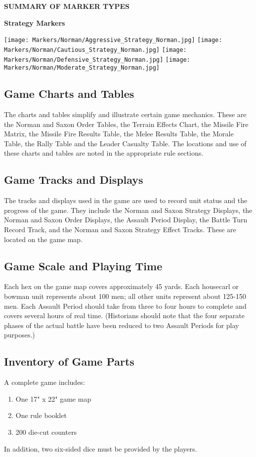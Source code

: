 \par
\begin{center}
  \textbf{SUMMARY OF MARKER TYPES}
  \break
  \par
  \textbf{Strategy Markers}
\end{center}

\hspace{1em}
\texttt{[image: Markers/Norman/Aggressive\_Strategy\_Norman.jpg]}
\hspace{1em}
\texttt{[image: Markers/Norman/Cautious\_Strategy\_Norman.jpg]}
\hspace{1em}
\texttt{[image: Markers/Norman/Defensive\_Strategy\_Norman.jpg]}
\hspace{1em}
\texttt{[image: Markers/Norman/Moderate\_Strategy\_Norman.jpg]}

\subsection{Game Charts and Tables}


The charts and tables simplify and illustrate certain game mechanics. These are the Norman and Saxon Order Tables, the Terrain Effects Chart, the Missile Fire Matrix, the Missile Fire Results Table, the Melee Results Table, the Morale Table, the Rally Table and the Leader Casualty Table. The locations and use of these charts and tables are noted in the appropriate rule sections.

\subsection{Game Tracks and Displays}

The tracks and displays used in the game are used to record unit status and the progress of the game. They include the Norman and Saxon Strategy Displays, the Norman and Saxon Order Displays, the Assault Period Display, the Battle Turn Record Track, and the Norman and Saxon Strategy Effect Tracks. These are located on the game map.

\subsection{Game Scale and Playing Time}

Each hex on the game map covers approximately 45 yards. Each housecarl or bowman unit represents about 100 men; all other units represent about 125-150 men. Each Assault Period should take from three to four hours to complete and covers several hours of real time. (Historians should note that the four separate phases of the actual battle have been reduced to two Assault Periods for play purposes.)

\subsection{Inventory of Game Parts}

A complete game includes:

\begin{enumerate}[label=*]
    \item One 17" x 22" game map
    \item One rule booklet
    \item 200 die-cut counters
\end{enumerate}

In addition, two six-sided dice must be provided by the players.